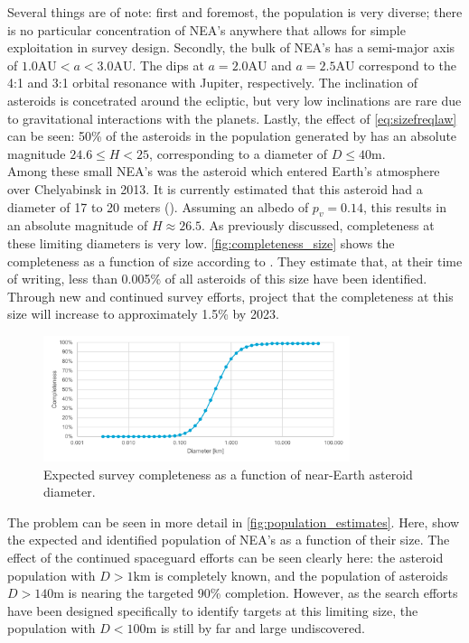 Several things are of note: first and foremost, the population is very diverse; there is no particular concentration of NEA's anywhere that allows for simple exploitation in survey design. Secondly, the bulk of NEA's has a semi-major axis of $1.0 \mathrm{AU} < a < 3.0 \mathrm{AU}$. The dips at $a = 2.0 \mathrm{AU}$ and $a = 2.5 \mathrm{AU}$ correspond to the 4:1 and 3:1 orbital resonance with Jupiter, respectively. The inclination of asteroids is concetrated around the ecliptic, but very low inclinations are rare due to gravitational interactions with the planets. Lastly, the effect of \autoref{eq:sizefreqlaw} can be seen: 50\% of the asteroids in the population generated by \cite{GranvikPopulation} has an absolute magnitude $24.6 \leq H < 25$, corresponding to a diameter of $D \leq 40 \mathrm{m}$. \\

Among these small NEA's was the asteroid which entered Earth's atmosphere over Chelyabinsk in 2013. It is currently estimated that this asteroid had a diameter of 17 to 20 meters (\cite{ChelyabinskNASA}). Assuming an albedo of $p_v = 0.14$, this results in an absolute magnitude of $H \approx 26.5$. As previously discussed, completeness at these limiting diameters is very low. \autoref{fig:completeness_size} shows the completeness as a function of size according to \cite{HarrisPopulation}. They estimate that, at their time of writing, less than 0.005\% of all asteroids of this size have been identified. Through new and continued survey efforts, \cite{2017NEOSDT} project that the completeness at this size will increase to approximately 1.5\% by 2023. \\

\begin{figure}[htbp]
 \centering
 \includegraphics[width=0.8\textwidth]{img/completeness_size.pdf}
 \caption{Expected survey completeness as a function of near-Earth asteroid diameter. \cite{HarrisPopulation}}
 \label{fig:completeness_size}
\end{figure}

The problem can be seen in more detail in \autoref{fig:population_estimates}. Here, \cite{HarrisPopulation} show the expected and identified population of NEA's as a function of their size. The effect of the continued spaceguard efforts can be seen clearly here: the asteroid population with $D > 1 \mathrm{km}$ is completely known, and the population of asteroids $D > 140 \mathrm{m}$ is nearing the targeted 90\% completion. However, as the search efforts have been designed specifically to identify targets at this limiting size, the population with $D < 100 \mathrm{m}$ is still by far and large undiscovered.

